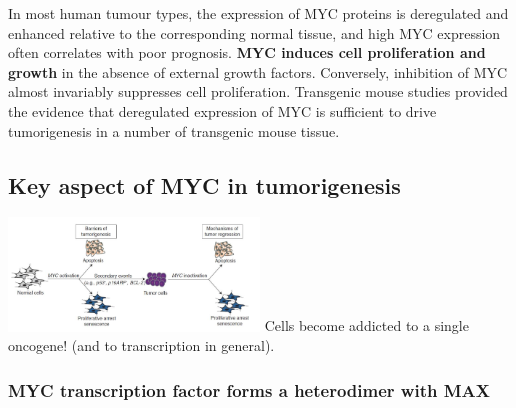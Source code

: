 In most human tumour types, the expression of MYC proteins is deregulated and enhanced relative to the corresponding normal tissue, and high MYC expression often correlates with poor prognosis. \textbf{MYC induces cell proliferation and growth} in the absence of external growth factors. Conversely, inhibition of MYC almost invariably suppresses cell proliferation.
Transgenic mouse studies provided the evidence that deregulated expression of MYC is sufficient to drive tumorigenesis in a number of transgenic mouse tissue.

\hypertarget{key-aspect-of-myc-in-tumorigenesis}{%
\subsection{Key aspect of MYC in tumorigenesis}\label{key-aspect-of-myc-in-tumorigenesis}}

\includegraphics[width=0.5\textwidth]{../_resources/18345a0e70ca9e50883ca61f93ad3405.png}
Cells become addicted to a single oncogene! (and to transcription in general).

\hypertarget{myc-transcription-factor-forms-a-heterodimer-with-max}{%
\subsubsection{MYC transcription factor forms a heterodimer with MAX}\label{myc-transcription-factor-forms-a-heterodimer-with-max}}

